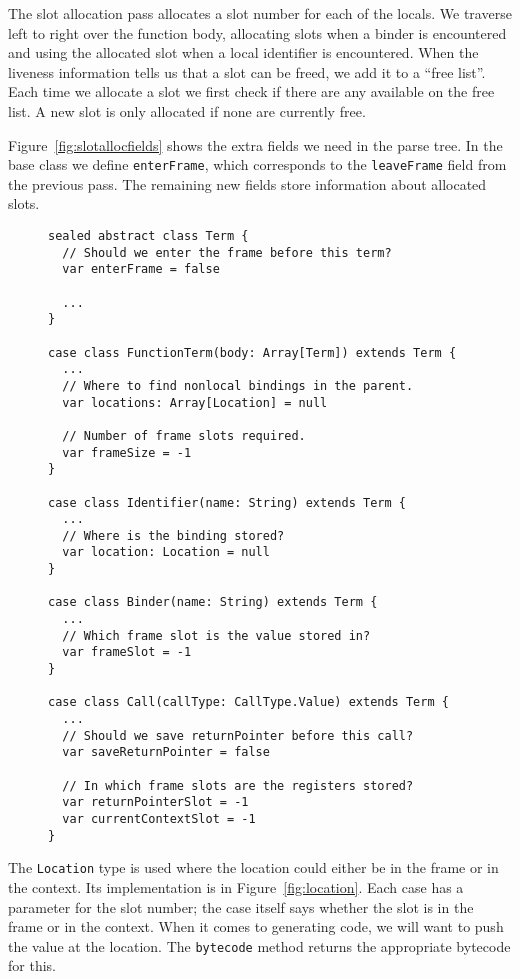 The slot allocation pass allocates a slot number for each of the locals.
We traverse left to right over the function body,
allocating slots when a binder is encountered
and using the allocated slot when a local identifier is encountered.
When the liveness information tells us that a slot can be freed,
we add it to a ``free list''.
Each time we allocate a slot
we first check if there are any available on the free list.
A new slot is only allocated if none are currently free.

Figure~\ref{fig:slotallocfields} shows
the extra fields we need in the parse tree.
In the base class we define \verb!enterFrame!,
which corresponds to the \verb!leaveFrame! field from the previous pass.
The remaining new fields store information about allocated slots.

\begin{figure}
\begin{verbatim}
sealed abstract class Term {
  // Should we enter the frame before this term?
  var enterFrame = false

  ...
}

case class FunctionTerm(body: Array[Term]) extends Term {
  ...
  // Where to find nonlocal bindings in the parent.
  var locations: Array[Location] = null

  // Number of frame slots required.
  var frameSize = -1
}

case class Identifier(name: String) extends Term {
  ...
  // Where is the binding stored?
  var location: Location = null
}

case class Binder(name: String) extends Term {
  ...
  // Which frame slot is the value stored in?
  var frameSlot = -1
}

case class Call(callType: CallType.Value) extends Term {
  ...
  // Should we save returnPointer before this call?
  var saveReturnPointer = false

  // In which frame slots are the registers stored?
  var returnPointerSlot = -1
  var currentContextSlot = -1
}
\end{verbatim}
\getcaption
\end{figure}

The \verb!Location! type is used where
the location could either be in the frame or in the context.
Its implementation is in Figure~\ref{fig:location}.
Each case has a parameter for the slot number;
the case itself says whether the slot is in the frame or in the context.
When it comes to generating code,
we will want to push the value at the location.
The \verb!bytecode! method returns the appropriate bytecode for this.

